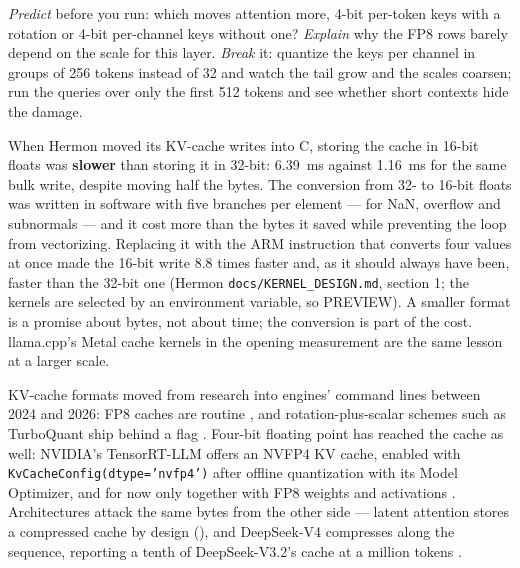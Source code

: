 \emph{Predict} before you run: which moves attention more, 4-bit
per-token keys with a rotation or 4-bit per-channel keys without one?
\emph{Explain} why the FP8 rows barely depend on the scale for this layer.
\emph{Break} it: quantize the keys per channel in groups of 256 tokens instead of
32 and watch the tail grow and the scales coarsen; run the queries over only the
first 512 tokens and see whether short contexts hide the damage.


When Hermon moved its KV-cache writes into C, storing the cache in 16-bit
floats was \textbf{slower} than storing it in 32-bit: 6.39~ms against 1.16~ms
for the same bulk write, despite moving half the bytes. The conversion from
32- to 16-bit floats was written in software with five branches per element
--- for NaN, overflow and subnormals --- and it cost more than the bytes it
saved while preventing the loop from vectorizing. Replacing it with the ARM
instruction that converts four values at once made the 16-bit write 8.8 times
faster and, as it should always have been, faster than the 32-bit one (Hermon
\texttt{docs/KERNEL\_DESIGN.md}, section 1; the kernels are selected by an
environment variable, so PREVIEW). A smaller format is a promise about bytes,
not about time; the conversion is part of the cost. llama.cpp's Metal cache
kernels in the opening measurement are the same lesson at a larger scale.


KV-cache formats moved from research into engines' command lines between 2024
and 2026: FP8 caches are routine \cite{vllm2026attentionbackends}, and
rotation-plus-scalar schemes such as TurboQuant ship behind a flag
\cite{vllm2026turboquantpr}. Four-bit floating point has reached the cache as
well: NVIDIA's TensorRT-LLM offers an NVFP4 KV cache, enabled with
\texttt{KvCacheConfig(dtype='nvfp4')} after offline quantization with its Model
Optimizer, and for now only together with FP8 weights and activations
\cite{nvidia2026trtllmquant}. Architectures attack the same bytes from the other
side --- latent attention stores a compressed cache by design
(), and DeepSeek-V4 compresses along the sequence, reporting
a tenth of DeepSeek-V3.2's cache at a million tokens \cite{deepseek2026v4}.

\ExercisesSection

